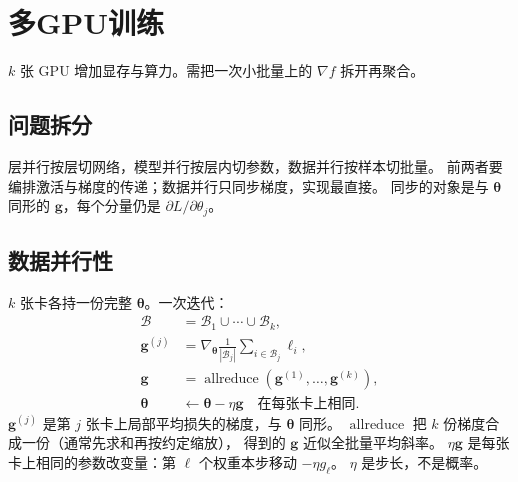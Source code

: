 \section{多GPU训练}





$k$ 张 GPU 增加显存与算力。需把一次小批量上的 $\nabla f$ 拆开再聚合。

\subsection{问题拆分}

层并行按层切网络，模型并行按层内切参数，数据并行按样本切批量。
前两者要编排激活与梯度的传递；数据并行只同步梯度，实现最直接。
同步的对象是与 $\bm{\theta}$ 同形的 $\bm{g}$，每个分量仍是 $\partial L/\partial\theta_j$。

\subsection{数据并行性}

$k$ 张卡各持一份完整 $\bm{\theta}$。一次迭代：
\begin{align*}
\mathcal{B}&=\mathcal{B}_1\cup\cdots\cup\mathcal{B}_k,
\\
\bm{g}^{(j)}&=\nabla_{\bm{\theta}}\frac{1}{|\mathcal{B}_j|}
\sum_{i\in\mathcal{B}_j}\ell_i,
\\
\bm{g}&=\operatorname{allreduce}(\bm{g}^{(1)},\ldots,\bm{g}^{(k)}),
\\
\bm{\theta}&\leftarrow\bm{\theta}-\eta\bm{g}
\quad\text{在每张卡上相同}.
\end{align*}
$\bm{g}^{(j)}$ 是第 $j$ 张卡上局部平均损失的梯度，与 $\bm{\theta}$ 同形。
$\operatorname{allreduce}$ 把 $k$ 份梯度合成一份（通常先求和再按约定缩放），
得到的 $\bm{g}$ 近似全批量平均斜率。
$\eta\bm{g}$ 是每张卡上相同的参数改变量：第 $\ell$ 个权重本步移动 $-\eta g_{\ell}$。
$\eta$ 是步长，不是概率。

